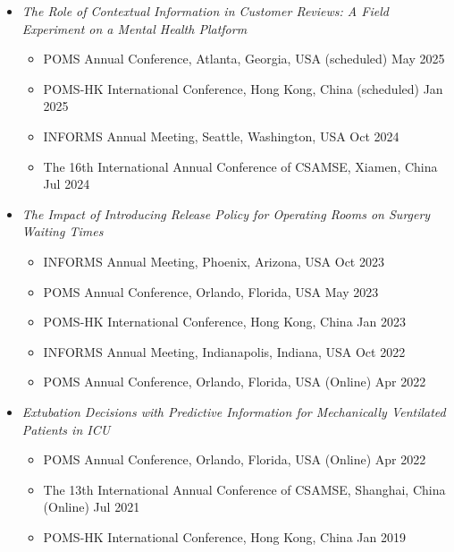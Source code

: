 \documentclass[12pt, a4paper]{article}
\begin{document}
{\begin{itemize}[leftmargin=14pt]
	\item[] {\it The Role of Contextual Information in Customer Reviews: A Field Experiment on a Mental Health Platform}
	\begin{itemize}[label=$\bullet$]
		\item POMS Annual Conference, Atlanta, Georgia, USA (scheduled) \hfill May 2025
		\item POMS-HK International Conference, Hong Kong, China (scheduled) \hfill Jan 2025
		\item INFORMS Annual Meeting, Seattle, Washington, USA \hfill Oct 2024
		\item The 16th International Annual Conference of CSAMSE, Xiamen, China \hfill Jul 2024
	\end{itemize}

	\item[] {\it The Impact of Introducing Release Policy for Operating Rooms on Surgery Waiting Times}
	\begin{itemize}[label=$\bullet$]
		\item INFORMS Annual Meeting, Phoenix, Arizona, USA \hfill Oct 2023
		\item POMS Annual Conference, Orlando, Florida, USA \hfill May 2023
		\item POMS-HK International Conference, Hong Kong, China \hfill Jan 2023
		\item INFORMS Annual Meeting, Indianapolis, Indiana, USA \hfill Oct 2022
		\item POMS Annual Conference, Orlando, Florida, USA (Online) \hfill Apr 2022
	\end{itemize}

	\item[] {\it Extubation Decisions with Predictive Information for Mechanically Ventilated Patients in ICU}
	\begin{itemize}[label=$\bullet$]
		\item POMS Annual Conference, Orlando, Florida, USA (Online) \hfill Apr 2022
		\item The 13th International Annual Conference of CSAMSE, Shanghai, China (Online) \hfill Jul 2021
		\item POMS-HK International Conference, Hong Kong, China \hfill Jan 2019
	\end{itemize}

\end{itemize}

}
\end{document}

